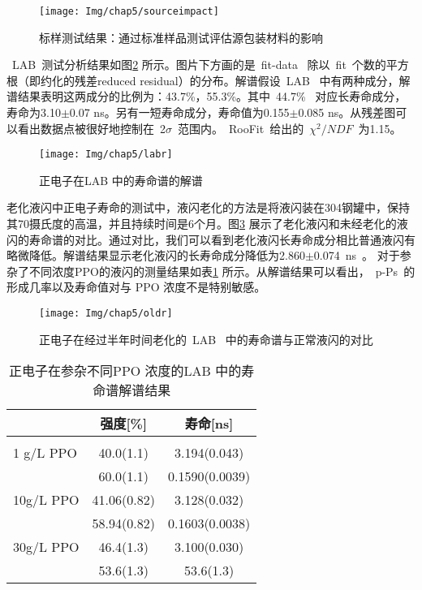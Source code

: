\begin{figure}[!htbp]
  \centering
   \texttt{[image: Img/chap5/sourceimpact]}
    \caption{标样测试结果：通过标准样品测试评估源包装材料的影响}
  \label{fig:p55}
\end{figure}
~LAB~测试分析结果如图\ref{fig:labs} 所示。图片下方画的是~fit-data~ 除以~fit~个数的平方根（即约化的残差reduced residual）的分布。解谱假设~LAB~ 中有两种成分，解谱结果表明这两成分的比例为：43.7\%，55.3\%。其中~44.7\%~ 对应长寿命成分，寿命为3.10$\pm$0.07 ns。另有一短寿命成分，寿命值为0.155$\pm$0.085 ns。从残差图可以看出数据点被很好地控制在~2$\sigma$~范围内。~RooFit~给出的~$\chi^{2}/NDF$~为1.15。
\begin{figure}[!htbp]
  \centering
   \texttt{[image: Img/chap5/labr]}
    \caption{正电子在LAB 中的寿命谱的解谱}
  \label{fig:labs}
\end{figure}
老化液闪中正电子寿命的测试中，液闪老化的方法是将液闪装在304钢罐中，保持其70摄氏度的高温，并且持续时间是6个月。图\ref{fig:oldrf} 展示了老化液闪和未经老化的液闪的寿命谱的对比。通过对比，我们可以看到老化液闪长寿命成分相比普通液闪有略微降低。解谱结果显示老化液闪的长寿命成分降低为2.860$\pm$0.074~ns~。 对于参杂了不同浓度PPO的液闪的测量结果如表\ref{tab:ppo} 所示。从解谱结果可以看出，~p-Ps~的形成几率以及寿命值对与 PPO 浓度不是特别敏感。
\begin{figure}[!htbp]
  \centering
   \texttt{[image: Img/chap5/oldr]}
    \caption{正电子在经过半年时间老化的~LAB~ 中的寿命谱与正常液闪的对比}
  \label{fig:oldrf}
\end{figure}

\begin{table}[htbp]
\centering  %
\begin{tabular}{lcc}  %
\hline
&强度[\%]&寿命[ns] \\ \hline  %
\\ 1 g/L PPO &40.0(1.1)  & 3.194(0.043) %
\\ & 60.0(1.1) &0.1590(0.0039)
\\ 10g/L PPO&41.06(0.82)               & 3.128(0.032)                            %
\\  &58.94(0.82)               &0.1603(0.0038)
\\  30g/L PPO&46.4(1.3)                 &3.100(0.030)
\\  & 53.6(1.3)                &53.6(1.3)
\\ \hline
\end{tabular}
\caption{正电子在参杂不同PPO 浓度的LAB 中的寿命谱解谱结果}
\label{tab:ppo}
\end{table}

